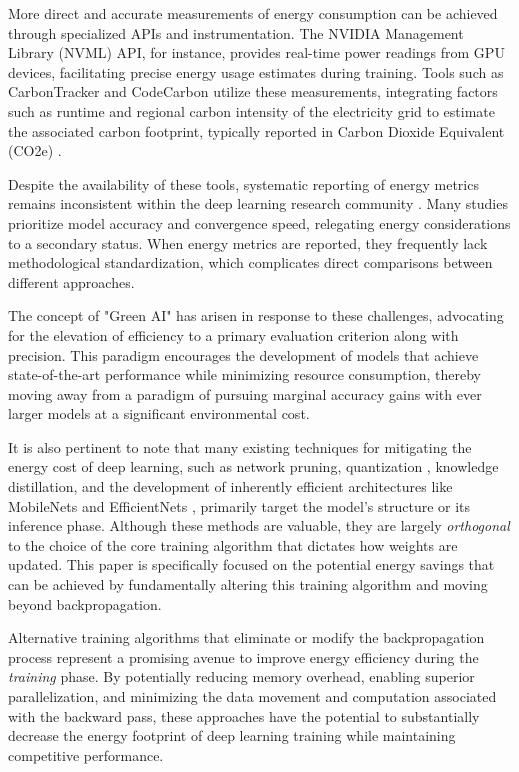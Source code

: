 More direct and accurate measurements of energy consumption can be achieved through specialized APIs and instrumentation. The NVIDIA Management Library (NVML) API, for instance, provides real-time power readings from GPU devices, facilitating precise energy usage estimates during training. Tools such as CarbonTracker \cite{anthony2020carbontracker} and CodeCarbon \cite{codecarbon2021} utilize these measurements, integrating factors such as runtime and regional carbon intensity of the electricity grid to estimate the associated carbon footprint, typically reported in Carbon Dioxide Equivalent (CO2e) \cite{codecarbon2021}.

Despite the availability of these tools, systematic reporting of energy metrics remains inconsistent within the deep learning research community \cite{henderson2020towards}. Many studies prioritize model accuracy and convergence speed, relegating energy considerations to a secondary status. When energy metrics are reported, they frequently lack methodological standardization, which complicates direct comparisons between different approaches.

The concept of "Green AI" \cite{schwartz2020green} has arisen in response to these challenges, advocating for the elevation of efficiency to a primary evaluation criterion along with precision. This paradigm encourages the development of models that achieve state-of-the-art performance while minimizing resource consumption, thereby moving away from a paradigm of pursuing marginal accuracy gains with ever larger models at a significant environmental cost.

It is also pertinent to note that many existing techniques for mitigating the energy cost of deep learning, such as network pruning, quantization \cite{jacob2018quantization}, knowledge distillation, and the development of inherently efficient architectures like MobileNets \cite{howard2017mobilenets} and EfficientNets \cite{tan2019efficientnet}, primarily target the model's structure or its inference phase. Although these methods are valuable, they are largely \emph{orthogonal} to the choice of the core training algorithm that dictates how weights are updated. This paper is specifically focused on the potential energy savings that can be achieved by fundamentally altering this training algorithm and moving beyond backpropagation.

Alternative training algorithms that eliminate or modify the backpropagation process represent a promising avenue to improve energy efficiency during the \emph{training} phase. By potentially reducing memory overhead, enabling superior parallelization, and minimizing the data movement and computation associated with the backward pass, these approaches have the potential to substantially decrease the energy footprint of deep learning training while maintaining competitive performance.

